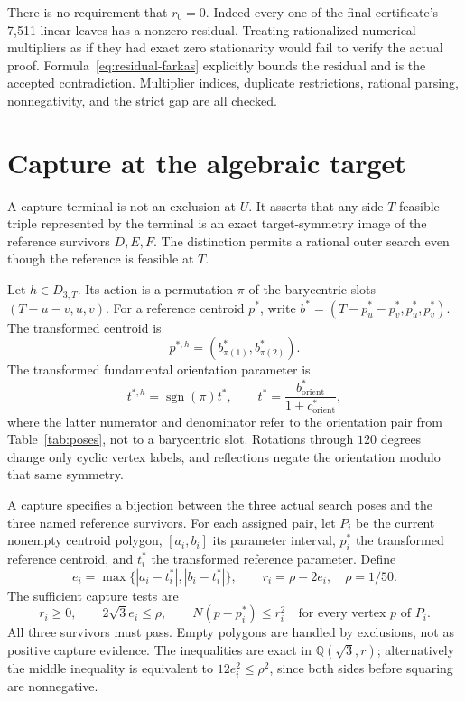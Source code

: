 \documentclass[11pt]{article}
\begin{document}
There is no requirement that $r_0=0$. Indeed every one of the final certificate's 7,511 linear leaves has a nonzero residual. Treating rationalized numerical multipliers as if they had exact zero stationarity would fail to verify the actual proof. Formula~\eqref{eq:residual-farkas} explicitly bounds the residual and is the accepted contradiction. Multiplier indices, duplicate restrictions, rational parsing, nonnegativity, and the strict gap are all checked.

\section{Capture at the algebraic target}\label{sec:capture}

A capture terminal is not an exclusion at $U$. It asserts that any side-$T$ feasible triple represented by the terminal is an exact target-symmetry image of the reference survivors $D,E,F$. The distinction permits a rational outer search even though the reference is feasible at $T$.

Let $h\in D_{3,T}$. Its action is a permutation $\pi$ of the barycentric slots $(T-u-v,u,v)$. For a reference centroid $p^*$, write $b^*=(T-p_u^*-p_v^*,p_u^*,p_v^*)$. The transformed centroid is
\[
 p^{*,h}=(b^*_{\pi(1)},b^*_{\pi(2)}).
\]
The transformed fundamental orientation parameter is
\[
 t^{*,h}=\operatorname{sgn}(\pi)t^*,
 \qquad t^*=\frac{b^*_{\mathrm{orient}}}{1+c^*_{\mathrm{orient}}},
\]
where the latter numerator and denominator refer to the orientation pair from Table~\ref{tab:poses}, not to a barycentric slot. Rotations through $120$ degrees change only cyclic vertex labels, and reflections negate the orientation modulo that same symmetry.

A capture specifies a bijection between the three actual search poses and the three named reference survivors. For each assigned pair, let $P_i$ be the current nonempty centroid polygon, $[a_i,b_i]$ its parameter interval, $p_i^*$ the transformed reference centroid, and $t_i^*$ the transformed reference parameter. Define
\[
 e_i=\max\{|a_i-t_i^*|,|b_i-t_i^*|\},\qquad r_i=\rho-2e_i,
 \quad\rho=1/50.
\]
The sufficient capture tests are
\begin{equation}\label{eq:capture}
 r_i\ge0,\qquad 2\sqrt3 e_i\le\rho,\qquad
 N(p-p_i^*)\le r_i^2
 \quad\text{for every vertex }p\text{ of }P_i.
\end{equation}
All three survivors must pass. Empty polygons are handled by exclusions, not as positive capture evidence. The inequalities are exact in $\mathbb Q(\sqrt3,r)$; alternatively the middle inequality is equivalent to $12e_i^2\le\rho^2$, since both sides before squaring are nonnegative.
\end{document}
